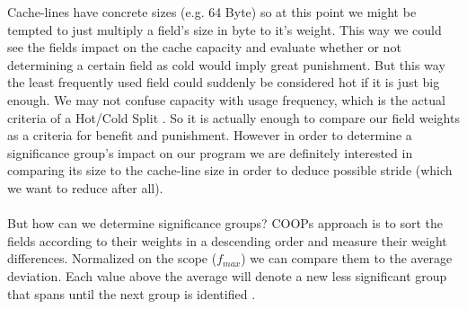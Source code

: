 Cache-lines have concrete sizes (e.g. 64 Byte) so at this point we might be tempted to just multiply a field's size in byte to it's weight. This way we could see the fields impact on the cache capacity and evaluate whether or not determining a certain field as cold would imply great punishment. But this way the least frequently used field could suddenly be considered hot if it is just big enough. We may not confuse capacity with usage frequency, which is the actual criteria of a Hot/Cold Split . So it is actually enough to compare our field weights as a criteria for benefit and punishment. However in order to determine a significance group's impact on our program we are definitely interested in comparing its size to the cache-line size in order to deduce possible stride (which we want to reduce after all).\\\\
But how can we determine significance groups? COOPs approach is to sort the fields according to their weights in a descending order and measure their weight differences. Normalized on the scope ($f_{max}$) we can compare them to the average deviation. Each value above the average will denote a new less significant group that spans until the next group is identified .

